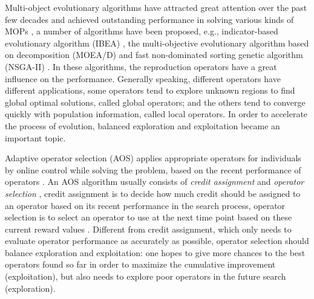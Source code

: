 \documentclass[journal]{IEEEtran}
\begin{document}
Multi-object evolutionary algorithms have attracted great attention over the past few decades and achieved outstanding performance in solving various kinds of MOPs \cite{fialho2010adaptive},
a number of algorithms have been proposed, e.g., indicator-based evolutionary algorithm (IBEA) \cite{IBEA}, the multi-objective evolutionary algorithm based on decomposition (MOEA/D) \cite{moead} and fast non-dominated sorting genetic algorithm (NSGA-II) \cite{nsga2}.
In these algorithms, the reproduction operators have a great influence on the performance.
Generally speaking, different operators have different applications, some operators tend to explore unknown regions to find global optimal solutions, called global operators; and the others tend to converge quickly with population information, called local operators.
In order to accelerate the process of evolution, balanced exploration and exploitation became an important topic.

Adaptive operator selection (AOS) applies appropriate operators for individuals by online control while solving the problem, based on the recent performance of operators \cite{li2011multi}.
An AOS algorithm usually consists of \textit{credit assignment} and \textit{operator selection} \cite{li2013evolving}, credit assignment is to decide how much credit should be assigned to an operator based on its recent performance in the search process, operator selection is to select an operator to use at the next time point based on these current reward values \cite{frrmab}.
Different from credit assignment, which only needs to evaluate operator performance as accurately as possible, operator selection should balance exploration and exploitation: one hopes to give more chances to the best operators found so far in order to maximize the cumulative improvement (exploitation), but also needs to explore poor operators in the future search (exploration).
\end{document}
